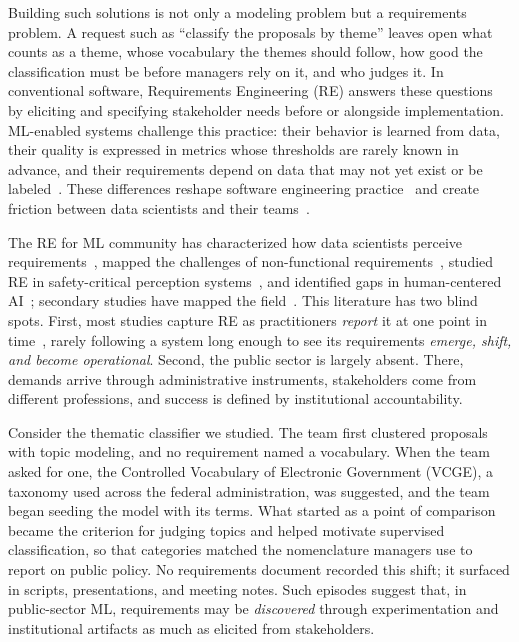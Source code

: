 \documentclass[sigconf,nonacm]{acmart}
\newif\ifshownotes
\newcommand{\isnote}[1]{\ifshownotes{\color{purple}\textbf{[IS:} #1\textbf{]}}\fi}
\newcommand{\csnote}[1]{\ifshownotes{\color{orange}\textbf{[CS:} #1\textbf{]}}\fi}
\begin{document}
Building such solutions is not only a modeling problem but a requirements problem. A request such as ``classify the proposals by theme'' leaves open what counts as a theme, whose vocabulary the themes should follow, how good the classification must be before managers rely on it, and who judges it. In conventional software, Requirements Engineering (RE) answers these questions by eliciting and specifying stakeholder needs before or alongside implementation. ML-enabled systems challenge this practice: their behavior is learned from data, their quality is expressed in metrics whose thresholds are rarely known in advance, and their requirements depend on data that may not yet exist or be labeled~\cite{vogelsang2019,horkoff2019}. These differences reshape software engineering practice~\cite{amershi2019} and create friction between data scientists and their teams~\cite{nahar2022}.

The RE for ML community has characterized how data scientists perceive requirements~\cite{vogelsang2019}, mapped the challenges of non-functional requirements~\cite{horkoff2019}, studied RE in safety-critical perception systems~\cite{habibullah2023}, and identified gaps in human-centered AI~\cite{ahmad2023}; secondary studies have mapped the field~\cite{villamizar2021}. This literature has two blind spots. First, most studies capture RE as practitioners \emph{report} it at one point in time~\cite{vogelsang2019,alves2023}, rarely following a system long enough to see its requirements \emph{emerge, shift, and become operational}. Second, the public sector is largely absent. There, demands arrive through administrative instruments, stakeholders come from different professions, and success is defined by institutional accountability.


Consider the thematic classifier we studied. The team first clustered proposals with topic modeling, and no requirement named a vocabulary. When the team asked for one, the Controlled Vocabulary of Electronic Government (VCGE), a taxonomy used across the federal administration, was suggested, and the team began seeding the model with its terms. What started as a point of comparison became the criterion for judging topics and helped motivate supervised classification, so that categories matched the nomenclature managers use to report on public policy. No requirements document recorded this shift; it surfaced in scripts, presentations, and meeting notes. Such episodes suggest that, in public-sector ML, requirements may be \emph{discovered} through experimentation and institutional artifacts as much as elicited from stakeholders.
\end{document}
